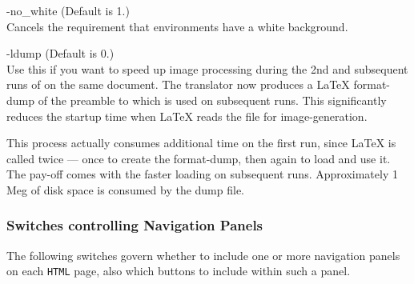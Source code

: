 \begin{htmllist}
\item [ -no\_white\label{cs_nowhite}]
 (Default is 1.)\\
Cancels the requirement that  environments have a white background.

%
\item [ -ldump\label{cs_ldump}]
 (Default is 0.)\\
Use this if you want to speed up image processing during the 2nd
and subsequent runs of \latextohtml{} on the same document.
The translator now produces a \LaTeX{} format-dump of the preamble to
 which is used on subsequent runs.
This significantly reduces the startup time when
\LaTeX{} reads the  file for image-generation.

This process actually consumes additional time on the first run, 
since \LaTeX{} is called twice --- once to create the format-dump,
then again to load and use it.
The pay-off comes with the faster loading on subsequent runs. 
Approximately 1 Meg of disk space is consumed by the dump file.
%
\end{htmllist}


\subsubsection{Switches controlling Navigation Panels\label{navoptions}}
%
The following switches govern whether to include one or more navigation
panels on each \texttt{HTML} page, 
also which buttons to include within such a panel.

